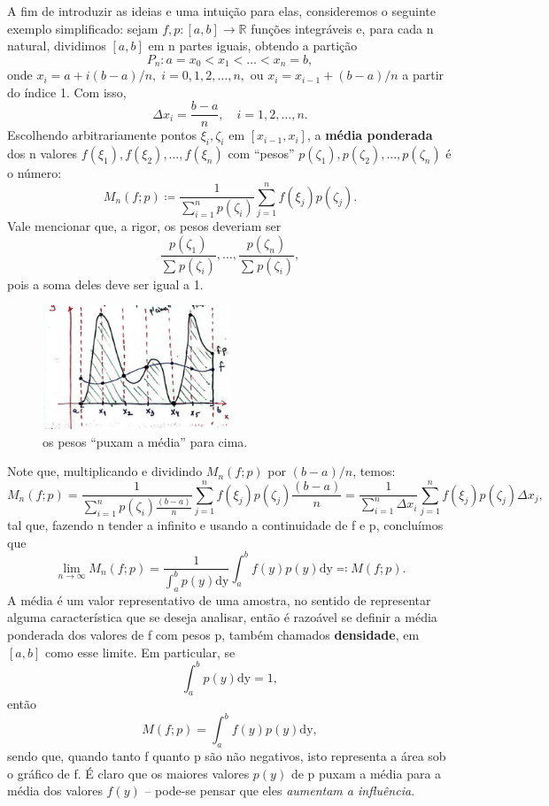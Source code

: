 \documentclass[../distribution_theory_notes.tex]{subfiles}
\begin{document}
A fim de introduzir as ideias e uma intuição para elas, consideremos o seguinte exemplo simplificado: sejam \(f, p:[a, b]\rightarrow \mathbb{R}\) funções integráveis e, para cada n natural, dividimos \([a, b]\) em n partes iguais, obtendo a partição
\[
	P_{n}: a=x_{0}<x_1<\dotsc <x_{n}=b,
\]
onde \(x_{i}=a + i (b-a)/n,\; i = 0,1,2,\dotsc ,n,\) ou \(x_{i}=x_{i-1}+(b-a)/n\) a partir do índice 1. Com isso,
\[
	\Delta x_{i}=\frac{b-a}{n},\quad i=1,2,\dotsc ,n.
\]
Escolhendo arbitrariamente pontos  \(\xi_{i}, \zeta_{i}\) em \([x_{i-1}, x_{i}]\), a \textbf{média ponderada} dos n valores \(f(\xi_1), f(\xi_2),\dotsc , f(\xi_{n})\) com ``pesos'' \(p(\zeta_1), p(\zeta_2), \dotsc , p(\zeta_{n})\) é o número:
\[
	M_{n}(f; p) \coloneqq \frac{1}{\sum\limits_{i=1}^{n}p(\zeta_{i})}\sum\limits_{j=1}^{n}f(\xi_{j})p(\zeta_{j}).
\]
Vale mencionar que, a rigor, os pesos deveriam ser
\[
	\frac{p(\zeta_1)}{\sum\limits_{}^{}p(\zeta_{i})}, \dotsc , \frac{p(\zeta_{n})}{\sum\limits_{}^{}p(\zeta_{i})},
\]
pois a soma deles deve ser igual a 1.
\begin{figure}[H]
	\begin{center}
		\includegraphics[height=0.5\textheight, width=0.5\textwidth, keepaspectratio]{./Images/weighted_avg_08.png}
	\end{center}
	\caption{os pesos ``puxam a média'' para cima.}
\end{figure}

Note que, multiplicando e dividindo \(M_{n}(f; p)\) por \((b-a)/n\), temos:
\[
	M_{n}(f; p)=\frac{1}{\sum\limits_{i=1}^{n}p(\zeta_{i})\frac{(b-a)}{n}}\sum\limits_{j=1}^{n}f(\xi_{j})p(\zeta_{j})\frac{(b-a)}{n} = \frac{1}{\sum\limits_{i=1}^{n}\Delta x_{i}}\sum\limits_{j=1}^{n}f(\xi_{j})p(\zeta_{j})\Delta x_{j},
\]
tal que, fazendo n tender a infinito e usando a continuidade de f e p, concluímos que
\[
	\lim_{n\to \infty}M_{n}(f; p)= \frac{1}{\int_{a}^{b}p(y) \mathrm{dy}}\int_{a}^{b}f(y)p(y) \mathrm{dy} \eqqcolon M(f; p).
\]
A média é um valor representativo de uma amostra, no sentido de representar alguma característica que se deseja analisar, então é razoável se definir a média ponderada dos valores de f com pesos p, também chamados \textbf{densidade}, em \([a, b]\) como esse limite. Em particular, se
\[
	\int_{a}^{b}p(y) \mathrm{dy}=1,
\]
então
\[
	M(f; p)=\int_{a}^{b}f(y)p(y) \mathrm{dy},
\]
sendo que, quando tanto f quanto p são não negativos, isto representa a área sob o gráfico de f. É claro que os maiores valores \(p(y)\) de p puxam a média para a média dos valores \(f(y)\) -- pode-se pensar que eles \textit{aumentam a influência}.
\end{document}
